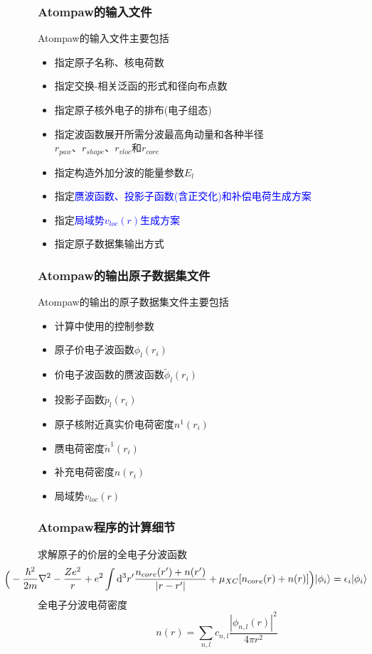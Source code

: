\documentclass[cjk,slidestop,compress,mathserif,blue]{beamer}
\begin{document}
\frame
{
	\frametitle{\textrm{Atompaw}的输入文件}
	\textrm{Atompaw}的输入文件主要包括
	\begin{itemize}
		\item 指定原子名称、核电荷数
		\item 指定交换-相关泛函的形式和径向布点数
		\item 指定原子核外电子的排布(电子组态)
		\item 指定波函数展开所需分波最高角动量和各种半径\\$r_{paw}$、$r_{shape}$、$r_{vloc}$和$r_{core}$
		\item 指定构造外加分波的能量参数$E_l$
		\item 指定\textcolor{blue}{赝波函数、投影子函数(含正交化)和补偿电荷生成方案}
		\item 指定\textcolor{blue}{局域势$v_{loc}(r)$生成方案}
		\item 指定原子数据集输出方式
	\end{itemize}
}

\frame
{
	\frametitle{\textrm{Atompaw}的输出原子数据集文件}
	\textrm{Atompaw}的输出的原子数据集文件主要包括
	\begin{itemize}
		\item 计算中使用的控制参数
		\item 原子价电子波函数$\phi_l(r_i)$
		\item 价电子波函数的赝波函数$\tilde\phi_l(r_i)$
		\item 投影子函数$\tilde p_l(r_i)$
		\item 原子核附近真实价电荷密度$n^1(r_i)$
		\item 赝电荷密度$\tilde n^1(r_i)$
		\item 补充电荷密度$\hat n(r_i)$
		\item 局域势$v_{loc}(r)$
	\end{itemize}
}

\frame
{
	\frametitle{\textrm{Atompaw}程序的计算细节}
	求解原子的价层的全电子分波函数
	$$\hspace*{-62pt}{\footnotesize\bigg(-\dfrac{\hbar^2}{2m}\nabla^2-\dfrac{Ze^2}r+e^2\int\mathrm{d}^3r^{\prime}\dfrac{n_{core}(r^{\prime})+n(r^{\prime})}{|r-r^{\prime}|}+\mu_{XC}[n_{core}(r)+n(r)]\bigg)|\phi_i\rangle=\epsilon_i|\phi_i\rangle}$$
	全电子分波电荷密度
	$$n(r)=\sum_{n,l}c_{n,l}\dfrac{|\phi_{n,l}(r)|^2}{4\pi r^2}$$
}
\end{document}
